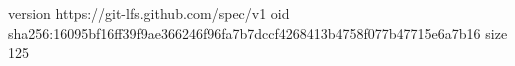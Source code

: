 version https://git-lfs.github.com/spec/v1
oid sha256:16095bf16ff39f9ae366246f96fa7b7dccf4268413b4758f077b47715e6a7b16
size 125
